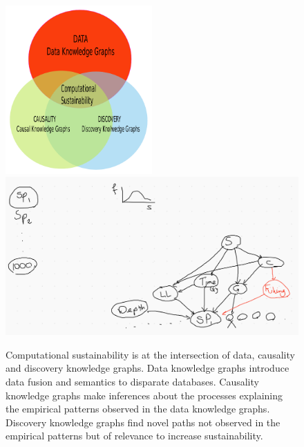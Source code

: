 \documentclass[12pt,a4paper]{article}
\begin{document}
\vspace{-0.5 in}
\begin{figure}[H]
	 \centering
	 \includegraphics[width = 0.5\textwidth]{Fig0.pdf}\\
	 \includegraphics[width = 1\textwidth]{Fig1BN.png}
	 \caption{Computational sustainability is at the intersection of data, causality and discovery knowledge graphs. Data knowledge graphs introduce data fusion and semantics to disparate databases. Causality knowledge graphs make inferences about the processes explaining the empirical patterns observed in the data knowledge graphs. Discovery knowledge graphs find novel paths not observed in the empirical patterns but of relevance to increase sustainability.}
\end{figure}   
\end{document}
